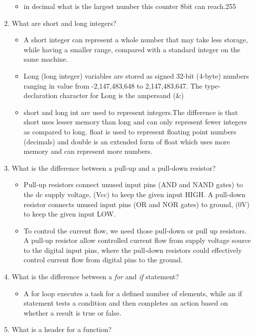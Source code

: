 \documentclass[pstricks,border=11pt]{article}
\begin{document}
\begin{enumerate}
\begin{itemize}
        \item in decimal what is the largest number this counter 8bit can reach.255
    \end{itemize}
    \item What are short and long integers?
    \begin{itemize}
        \item A short integer can represent a whole number that may take less storage, while having a smaller range, compared with a standard integer on the same machine.
        \item Long (long integer) variables are stored as signed 32-bit (4-byte) numbers ranging in value from -2,147,483,648 to 2,147,483,647. The type-declaration character for Long is the ampersand (\&)
        \item short and long int are used to represent integers.The difference is that short uses lesser memory than long and can only represent fewer integers as compared to long. float is used to represent floating point numbers (decimals) and double is an extended form of float which uses more memory and can represent more numbers.
    \end{itemize}
    \item What is the difference between a pull-up and a pull-down resistor?
    \begin{itemize}
        \item Pull-up resistors connect unused input pins (AND and NAND gates) to the dc supply voltage, (Vcc) to keep the given input HIGH. A pull-down resistor connects unused input pins (OR and NOR gates) to ground, (0V) to keep the given input LOW.
        \item To control the current flow, we need those pull-down or pull up resistors. A pull-up resistor allow controlled current flow from supply voltage source to the digital input pins, where the pull-down resistors could effectively control current flow from digital pins to the ground.
    \end{itemize}
    \item What is the difference between a \textit{for} and \textit{if} statement?
    \begin{itemize}
        \item A for loop executes a task for a defined number of elements, while an if statement tests a condition and then completes an action based on whether a result is true or false. 
    \end{itemize}
    \item What is a header for a function?

\end{enumerate}
\end{document}
